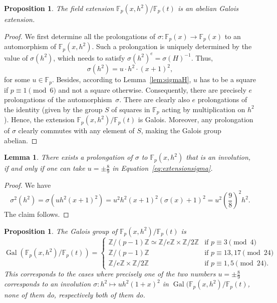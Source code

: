 \documentclass{article}
\newcommand{\Z}{\mathbb{Z}}
\newcommand{\F}{\mathbb{F}}
\DeclareMathOperator{\Gal}{Gal}
\theoremstyle{definition}
\theoremstyle{plain}
\newtheorem{lem}[defi]{Lemma}
\newtheorem{prop}[defi]{Proposition}
\theoremstyle{remark}
\begin{document}
\begin{prop}
    The field extension $\F_p(x,h^2)/\F_p(t)$ is an abelian Galois extension.
\end{prop}
\begin{proof}
    We first determine all the prolongations of $\sigma : \F_p(x) \to \F_p(x)$ to an automorphism of $\F_p(x, h^2)$.
    Such a prolongation is uniquely determined by the value of $\sigma(h^2)$, which needs to satisfy $\sigma(h^2)^e=\sigma(H)^{-1}$. Thus,
    \begin{equation} \label{eq:extensionsigma}
        \sigma(h^2) = u \cdot h^2 \cdot (x+1)^2,
    \end{equation}
    for some $u \in \F_p$.
    Besides, according to Lemma~\ref{lem:sigmaH}, $u$ has to be a square if $p\equiv 1 \pmod 6$ and not a square otherwise.
    Consequently, there are precisely $e$ prolongations of the automorphism~$\sigma$. There are clearly also $e$ prolongations of the identity (given by the group $S$ of squares in $\F_p$ acting by multiplication on $h^2$). Hence, the extension $\F_p(x,h^2)/\F_p(t)$ is Galois. Moreover, any prolongation of $\sigma$ clearly commutes with any element of $S$, making the Galois group abelian.
\end{proof}

\begin{lem} \label{lem:extsigma}
    There exists a prolongation of $\sigma$ to $\F_p(x, h^2)$ that is an involution, if and only if one can take $u=\pm\frac 8 9$ in Equation~\eqref{eq:extensionsigma}.
\end{lem}
\begin{proof}
    We have 
    \[\sigma^2(h^2)=  \sigma(u h^2 (x+1)^2) = u^2 h^2 (x+1)^2 (\sigma(x)+1)^2= u^2 \left(\frac{9}{8}\right)^2 h^2.\] The claim follows.
\end{proof}


\begin{prop} \label{prop:Galh}
    The Galois group of $\F_p(x,h^2)/\F_p(t)$ is 
    \[\Gal(\F_p(x,h^2)/\F_p(t)) = \begin{cases}
        \Z/(p{-}1)\Z\simeq \Z/e\Z\times \Z/2\Z & \text{if } p\equiv 3 \pmod 4\\
        \Z/(p{-}1)\Z & \text{if } p\equiv 13, 17 \pmod {24}\\
        \Z/e\Z\times \Z/2\Z& \text{if } p\equiv 1, 5 \pmod {24}.
    \end{cases}
    \]
    This corresponds to the cases where precisely one of the two numbers $u =\pm \frac 8 9$ corresponds to an involution $\sigma: h^2\mapsto u h^2 (1+x)^2$ in $\Gal(\F_p(x, h^2)/\F_p(t)$, none of them do, respectively both of them do.
\end{prop}
\end{document}
